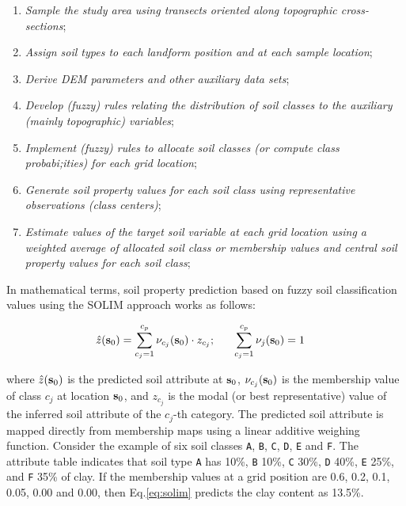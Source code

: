 \documentclass[11pt]{krantz}
\theoremstyle{definition}
\theoremstyle{definition}
\theoremstyle{definition}
\theoremstyle{remark}
\begin{document}
\begin{enumerate}
\def\labelenumi{\arabic{enumi}.}
\item
  \emph{Sample the study area using transects oriented along topographic
  cross-sections};
\item
  \emph{Assign soil types to each landform position and at each sample
  location};
\item
  \emph{Derive DEM parameters and other auxiliary data sets};
\item
  \emph{Develop (fuzzy) rules relating the distribution of soil classes
  to the auxiliary (mainly topographic) variables};
\item
  \emph{Implement (fuzzy) rules to allocate soil classes (or compute
  class probabi;ities) for each grid location};
\item
  \emph{Generate soil property values for each soil class using
  representative observations (class centers)};
\item
  \emph{Estimate values of the target soil variable at each grid
  location using a weighted average of allocated soil class or
  membership values and central soil property values for each soil
  class};
\end{enumerate}

In mathematical terms, soil property prediction based on fuzzy soil
classification values using the SOLIM approach \citeauthor{Zhu2001}
\citetext{\citeyear{Zhu2001}; \citealp{Zhu2010Geoderma}} works as
follows:

\begin{equation}
\begin{aligned}
 \hat z({\bf{s}}_0) = \sum\limits_{c_j = 1}^{c_p} {\nu _{c_j} ({\bf{s}}_0) \cdot z_{c_j} }; & \hspace{.6cm}
 \sum\limits_{c_j = 1}^{c_p} {\nu _j ({\bf{s}}_0)}  = 1\end{aligned}
\label{eq:solim}
\end{equation}

where \(\hat z({\bf{s}}_0)\) is the predicted soil attribute at
\({\bf{s}}_0\), \(\nu _{c_j} ({\bf{s}}_0)\) is the membership value of
class \(c_j\) at location \({\bf{s}}_0\), and \(z_{c_j}\) is the modal
(or best representative) value of the inferred soil attribute of the
\(c_j\)-th category. The predicted soil attribute is mapped directly
from membership maps using a linear additive weighing function. Consider
the example of six soil classes \texttt{A}, \texttt{B}, \texttt{C},
\texttt{D}, \texttt{E} and \texttt{F}. The attribute table indicates
that soil type \texttt{A} has 10\%, \texttt{B} 10\%, \texttt{C} 30\%,
\texttt{D} 40\%, \texttt{E} 25\%, and \texttt{F} 35\% of clay. If the
membership values at a grid position are 0.6, 0.2, 0.1, 0.05, 0.00 and
0.00, then Eq.\eqref{eq:solim} predicts the clay content as 13.5\%.
\end{document}
